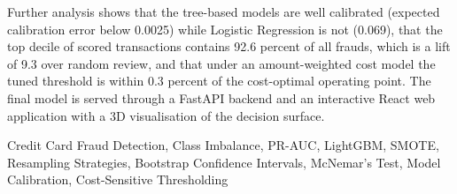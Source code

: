 Further analysis shows that the tree-based models are well calibrated (expected calibration
error below 0.0025) while Logistic Regression is not (0.069), that the top decile of scored
transactions contains 92.6 percent of all frauds, which is a lift of 9.3 over random
review, and that under an amount-weighted cost model the tuned threshold is within 0.3
percent of the cost-optimal operating point. The final model is served through a FastAPI
backend and an interactive React web application with a 3D visualisation of the decision
surface.

\begin{keywords}
Credit Card Fraud Detection, Class Imbalance, PR-AUC, LightGBM, SMOTE, Resampling
Strategies, Bootstrap Confidence Intervals, McNemar's Test, Model Calibration,
Cost-Sensitive Thresholding
\end{keywords}
